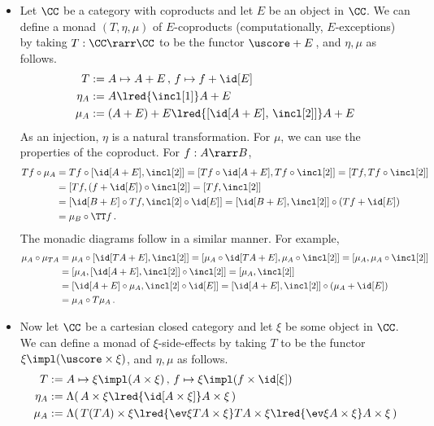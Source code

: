 \documentclass{svmult}
\begin{document}
\begin{itemize}
\item Let $\CC$ be a category with coproducts and let $E$ be an object in $\CC$. We can define a monad $(T,\eta,\mu)$ of $E$-coproducts
    (computationally, $E$-exceptions) by taking $T:\CC\rarr\CC$ to be the functor $\uscore+E$\,, and $\eta,\mu$ as follows.
    \begin{align*}
      T &:= A\mapsto A+E\,,\, f\mapsto f+\id[E] \\
      \eta_A &:= A\lred{\incl[1]}A+E \\
      \mu_A &:=  (A+E)+E\lred{[\id[A+E],\,\incl[2]]}A+E
    \end{align*}
    As an injection, $\eta$ is a natural transformation. For $\mu$, we can use the properties of the coproduct. For $f:A\rarr B$,
   \begin{align*}
     Tf\circ\mu_A &= Tf\circ[\id[A+E],\incl[2]]=[Tf\circ\id[A+E],Tf\circ\incl[2]]=[Tf,Tf\circ\incl[2]] \\
     &= [Tf,(f+\id[E])\circ\incl[2]] = [Tf,\incl[2]] \\
     &= [\id[B+E]\circ Tf,\incl[2]\circ\id[E]]=[\id[B+E],\incl[2]]\circ(Tf+\id[E]) \\
     &= \mu_B\circ\TT f\,.
   \end{align*}
   The monadic diagrams follow in a similar manner. For example,
   \begin{align*}
     \mu_A\circ\mu_{TA} &= \mu_A\circ[\id[TA+E],\incl[2]] = [\mu_A\circ\id[TA+E],\mu_A\circ\incl[2]]=[\mu_A,\mu_A\circ\incl[2]] \\
       &= [\mu_A,[\id[A+E],\incl[2]]\circ\incl[2]] = [\mu_A,\incl[2]] \\
       &= [\id[A+E]\circ\mu_A, \incl[2]\circ\id[E]] = [\id[A+E], \incl[2]]\circ(\mu_A+\id[E]) \\
       &= \mu_A\circ T\mu_A\,.
   \end{align*}
    \item Now let $\CC$ be a cartesian closed category and let $\xi$ be some object in $\CC$. We can define a monad of $\xi$-side-effects by taking
    $T$ to be the functor $\xi\impl(\uscore\times\xi)$, and $\eta,\mu$ as follows.
    \begin{align*}
      T      &:= A\mapsto\xi\impl(A\times\xi)\,,\,f\mapsto\xi\impl(f\times\id[\xi]) \\
      \eta_A &:= \Lambda(\,A\times\xi\lred{\id[A\times\xi]}A\times\xi\,) \\
      \mu_A  &:= \Lambda(\, T(TA)\times\xi \lred{\ev\xi{TA\times\xi}} TA\times\xi\lred{\ev\xi{A\times\xi}}A\times\xi\,)

\end{align*}
\end{itemize}
\end{document}
